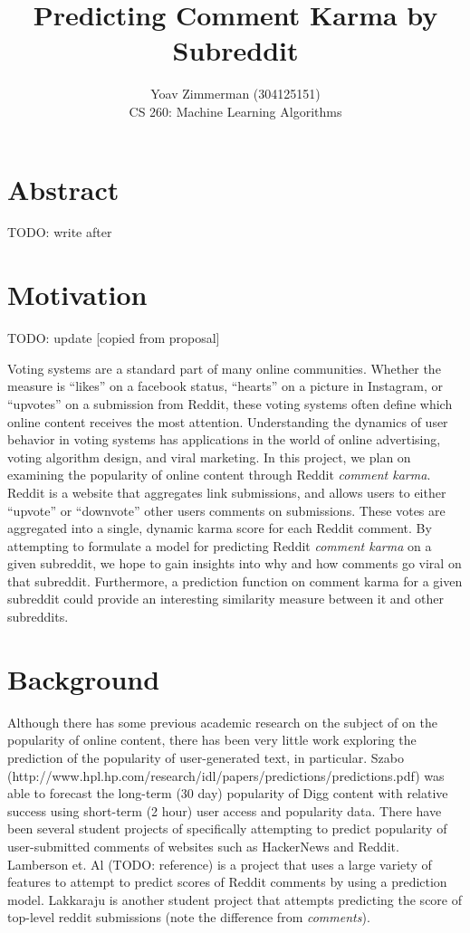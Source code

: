 \documentclass[11pt, twocolumn]{article}
\begin{document}
\title{Predicting Comment Karma by Subreddit}
\author{Yoav Zimmerman (304125151) \\
	    CS 260: Machine Learning Algorithms \\}
\maketitle

\section{Abstract}

TODO: write after

\section{Motivation}

TODO: update [copied from proposal]

Voting systems are a standard part of many online communities. Whether the measure is ``likes'' on a facebook status, “hearts” on a picture in Instagram, or “upvotes” on a submission from Reddit, these voting systems often define which online content receives the most attention. Understanding the dynamics of user behavior in voting systems has applications in the world of online advertising, voting algorithm design, and viral marketing. In this project, we plan on examining the popularity of online content through Reddit \textit{comment karma}. Reddit is a website that aggregates link submissions, and allows users to either “upvote” or “downvote” other users comments on submissions. These votes are aggregated into a single, dynamic karma score for each Reddit comment. By attempting to formulate a model for predicting Reddit \textit{comment karma} on a given subreddit, we hope to gain insights into why and how comments go viral on that subreddit. Furthermore, a prediction function on comment karma for a given subreddit could provide an interesting similarity measure between it and other subreddits.

\section{Background}

Although there has some previous academic research on the subject of on the popularity of online content, there has been very little work exploring the prediction of the popularity of user-generated text, in particular. Szabo (http://www.hpl.hp.com/research/idl/papers/predictions/predictions.pdf) was able to forecast the long-term (30 day) popularity of Digg content with relative success using short-term (2 hour) user access and popularity data. There have been several student projects of specifically attempting to predict popularity of user-submitted comments of websites such as HackerNews and Reddit. Lamberson et. Al (TODO: reference) is a project that uses a large variety of features to attempt to predict scores of Reddit comments by using a prediction model. Lakkaraju is another student project that attempts predicting the score of top-level reddit submissions (note the difference from \textit{comments}). 
\end{document}
